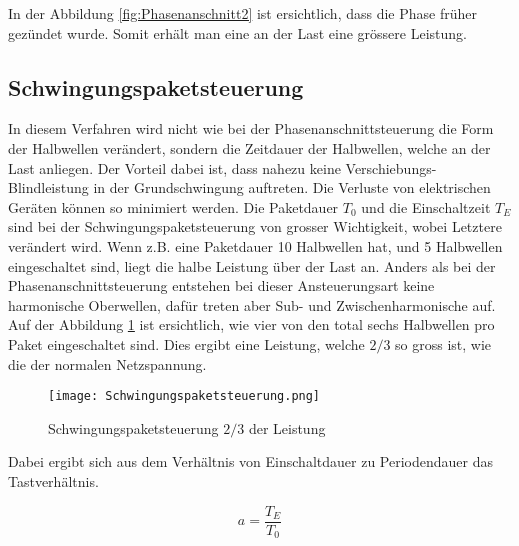 In der Abbildung \ref{fig:Phasenanschnitt2} ist ersichtlich, dass die Phase früher gezündet wurde. Somit erhält man eine an der Last eine grössere Leistung.



\subsection{Schwingungspaketsteuerung}
In diesem Verfahren wird nicht wie bei der Phasenanschnittsteuerung die Form der Halbwellen verändert, sondern die Zeitdauer der Halbwellen, welche an der Last anliegen. Der Vorteil dabei ist, dass nahezu keine Verschiebungs-Blindleistung in der Grundschwingung auftreten. Die Verluste von elektrischen Geräten können so minimiert werden. Die Paketdauer $T_0$ und die Einschaltzeit $T_E$ sind bei der Schwingungspaketsteuerung von grosser Wichtigkeit, wobei Letztere verändert wird. Wenn z.B. eine Paketdauer 10 Halbwellen hat, und 5 Halbwellen eingeschaltet sind, liegt die halbe Leistung über der Last an. Anders als bei der Phasenanschnittsteuerung entstehen bei dieser Ansteuerungsart keine harmonische Oberwellen, dafür treten aber Sub- und Zwischenharmonische auf. Auf der Abbildung \ref{fig:Schwingungspaketsteuerung} ist ersichtlich, wie vier von den total sechs Halbwellen pro Paket eingeschaltet sind. Dies ergibt eine Leistung, welche ${2}/{3}$ so gross ist, wie die der normalen Netzspannung.

\begin{figure}[ht!]
	\centering
	\texttt{[image: Schwingungspaketsteuerung.png]}	
	\caption{Schwingungspaketsteuerung ${2}/{3}$ der Leistung \cite{Schwingungspaketsteuerung}}\label{fig:Schwingungspaketsteuerung}
\end{figure}

Dabei ergibt sich aus dem Verhältnis von Einschaltdauer zu Periodendauer das Tastverhältnis.

\begin{equation}\label{eq:Einschaltverhältnis}
a = \frac{T_E}{T_0}
\end{equation}




